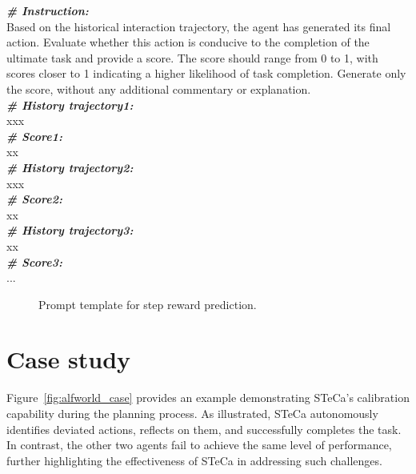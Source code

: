 \begin{tcolorbox}[breakable,title=Prompt for Step Reward Prediction]
\textbf{\textit{\# Instruction:}} \\
Based on the historical interaction trajectory, the agent has generated its final action. Evaluate whether this action is conducive to the completion of the ultimate task and provide a score. The score should range from 0 to 1, with scores closer to 1 indicating a higher likelihood of task completion. Generate only the score, without any additional commentary or explanation. \\

\textbf{\textit{\# History trajectory1:}} \\
xxx \\
\textbf{\textit{\# Score1:}} \\
xx \\
\textbf{\textit{\# History trajectory2:}} \\
xxx \\
\textbf{\textit{\# Score2:}} \\
xx \\
\textbf{\textit{\# History trajectory3:}} \\
xx \\
\textbf{\textit{\# Score3:}} \\
...
\end{tcolorbox}

\begin{figure}[ht]
    \centering
    \vspace{-8pt}
    \caption{
    Prompt template for step reward prediction.
    }
    \label{fig:reflection prompt for step rewards in vh}
\end{figure}


\section{Case study}
\label{appendix:case_study}

Figure~\ref{fig:alfworld_case} provides an example demonstrating STeCa's calibration capability during the planning process. As illustrated, STeCa autonomously identifies deviated actions, reflects on them, and successfully completes the task. In contrast, the other two agents fail to achieve the same level of performance, further highlighting the effectiveness of STeCa in addressing such challenges.

\onecolumn

